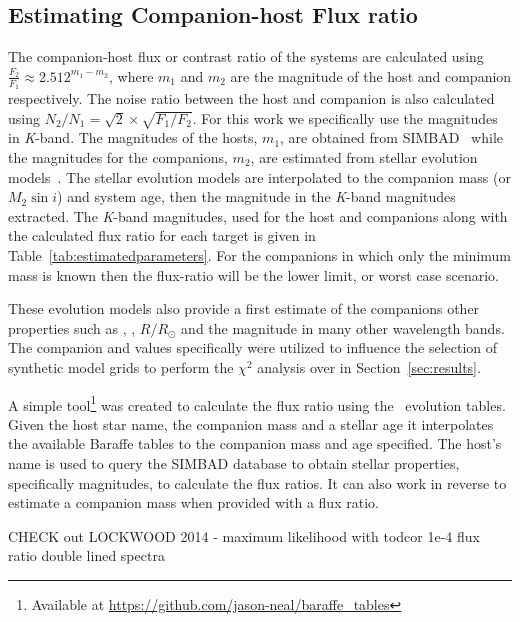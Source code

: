 

\subsection{Estimating Companion-host Flux ratio}
\label{compaion flux ration}
The companion-host flux or contrast ratio of the systems are calculated using \( \frac{F_{2}}{F_{1}} \approx 2.512^{m_{1}-m_{2}} \), where \(m_{1} \) and \(m_{2} \) are the magnitude of the host and companion respectively. The noise ratio between the host and companion is also calculated using \(N_{2}/N_{1} = \sqrt{2} \times\sqrt{F_{1}/F_{2}}\).  For this work we specifically use the magnitudes in \textit{K}-band. The magnitudes of the hosts, \(m_{1} \), are obtained from SIMBAD~\citep{wenger_simbad_2000} while the magnitudes for the companions, \(m_{2} \), are estimated from stellar evolution models~\citet{baraffe_evolutionary_2003, baraffe_new_2015}. The stellar evolution models are interpolated to the companion mass (or \(M_{2}\sin{i}\)) and system age, then the magnitude in the \textit{K}-band magnitudes extracted. The \textit{K}-band magnitudes, used for the host and companions along with the calculated flux ratio for each target is given in Table~\ref{tab:estimatedparameters}. For the companions in which only the minimum mass is known then the flux-ratio will be the lower limit, or worst case scenario.

These evolution models also provide a first estimate of the companions other properties such as \teff{}, \logg{}, \(R/R_{\odot}\) and the magnitude in many other wavelength bands.  The companion \teff{} and \logg{} values specifically were utilized to influence the selection of synthetic model grids to perform the \(\chi^2\) analysis over in Section~\ref{sec:results}.

A simple tool\footnote{Available at \url{https://github.com/jason-neal/baraffe_tables}} was created to calculate the flux ratio using the~\citep{baraffe_evolutionary_2003,baraffe_new_2015} evolution tables. Given the host star name, the companion mass and a stellar age it interpolates the available Baraffe tables to the companion mass and age specified. The host's name is used to query the {SIMBAD} database to obtain stellar properties, specifically magnitudes, to calculate the flux ratios. It can also work in reverse to estimate a companion mass when provided with a flux ratio.







CHECK out LOCKWOOD 2014 - maximum likelihood with todcor 1e-4 flux ratio double lined spectra
